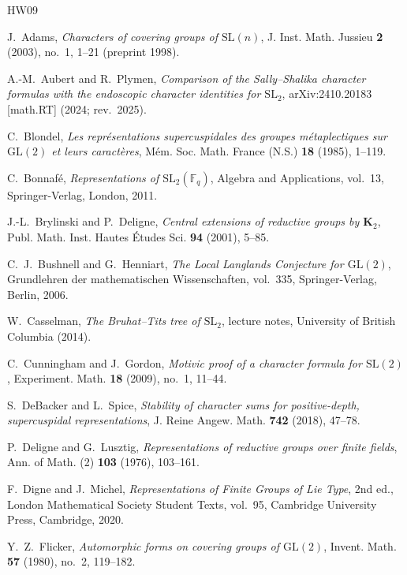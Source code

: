 \documentclass[12pt, letterpaper]{article}
\numberwithin{equation}{section}
\theoremstyle{definition}
\theoremstyle{remark}
\begin{document}
\begin{thebibliography}{HW09}

J.~Adams,
\emph{Characters of covering groups of $\mathrm{SL}(n)$},
J. Inst. Math. Jussieu \textbf{2} (2003), no.~1, 1--21 (preprint 1998).

A.-M.~Aubert and R.~Plymen,
\emph{Comparison of the Sally--Shalika character formulas with the endoscopic character identities for $\mathrm{SL}_2$},
arXiv:2410.20183 [math.RT] (2024; rev.~2025).

C.~Blondel,
\emph{Les repr\'esentations supercuspidales des groupes m\'etaplectiques sur $\mathrm{GL}(2)$ et leurs caract\`eres},
M\'em. Soc. Math. France (N.S.) \textbf{18} (1985), 1--119.

C.~Bonnaf\'e,
\emph{Representations of $\mathrm{SL}_2(\mathbb{F}_q)$},
Algebra and Applications, vol.~13, Springer-Verlag, London, 2011.

J.-L.~Brylinski and P.~Deligne,
\emph{Central extensions of reductive groups by $\mathbf{K}_2$},
Publ. Math. Inst. Hautes \'Etudes Sci. \textbf{94} (2001), 5--85.

C.~J.~Bushnell and G.~Henniart,
\emph{The Local Langlands Conjecture for $\mathrm{GL}(2)$},
Grundlehren der mathematischen Wissenschaften, vol.~335, Springer-Verlag, Berlin, 2006.

W.~Casselman,
\emph{The Bruhat--Tits tree of $\mathrm{SL}_2$},
lecture notes, University of British Columbia (2014).

C.~Cunningham and J.~Gordon,
\emph{Motivic proof of a character formula for $\mathrm{SL}(2)$},
Experiment. Math. \textbf{18} (2009), no.~1, 11--44.

S.~DeBacker and L.~Spice,
\emph{Stability of character sums for positive-depth, supercuspidal representations},
J. Reine Angew. Math. \textbf{742} (2018), 47--78.

P.~Deligne and G.~Lusztig,
\emph{Representations of reductive groups over finite fields},
Ann. of Math. (2) \textbf{103} (1976), 103--161.

F.~Digne and J.~Michel,
\emph{Representations of Finite Groups of Lie Type},
2nd ed., London Mathematical Society Student Texts, vol.~95, Cambridge University Press, Cambridge, 2020.

Y.~Z.~Flicker,
\emph{Automorphic forms on covering groups of $\mathrm{GL}(2)$},
Invent. Math. \textbf{57} (1980), no.~2, 119--182.


\end{thebibliography}
\end{document}
